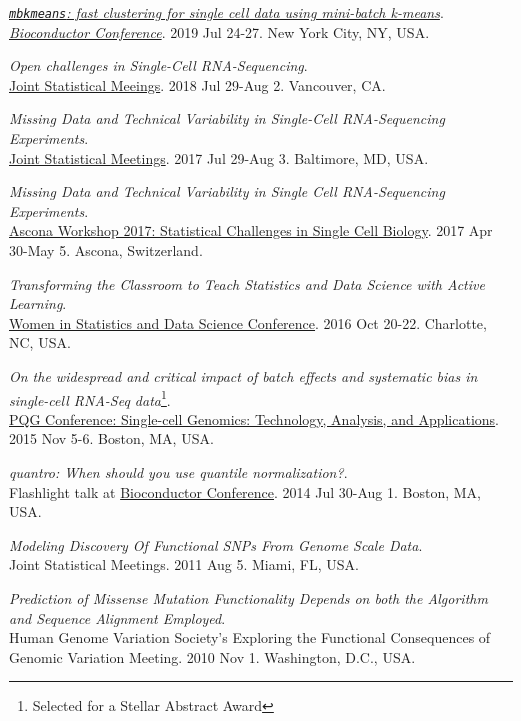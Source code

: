 \documentclass[10pt]{article}
\begin{document}
\item 
{\it \href{https://docs.google.com/presentation/d/1AlwLGTlc3ZFxY8PLpCZ5cwD3ktQyQqb1V6qub2I8360/edit?usp=sharing}{\texttt{mbkmeans}: fast clustering for single cell data using mini-batch k-means}}. \\
\href{http://bioc2019.bioconductor.org}{{\it Bioconductor Conference}}. 2019 Jul 24-27. New York City, NY, USA.
\item 
{\it Open challenges in Single-Cell RNA-Sequencing}. \\
\href{https://ww2.amstat.org/meetings/jsm/2018/onlineprogram/ActivityDetails.cfm?SessionID=215111}{Joint Statistical Meeings}. 2018 Jul 29-Aug 2. Vancouver, CA.
\item 
{\it Missing Data and Technical Variability in Single-Cell RNA-Sequencing Experiments}. \\
\href{https://ww2.amstat.org/meetings/jsm/2017/}{Joint Statistical Meetings}. 2017 Jul 29-Aug 3. Baltimore, MD, USA.
\item 
{\it Missing Data and Technical Variability in Single Cell RNA-Sequencing Experiments}. \\
\href{https://www.bsse.ethz.ch/cbg/cbg-news/ascona-2017.html}{Ascona Workshop 2017: Statistical Challenges in Single Cell Biology}. 2017 Apr 30-May 5. Ascona, Switzerland.
\item 
{\it Transforming the Classroom to Teach Statistics and Data Science with Active Learning}. \\ 
\href{http://www.amstat.org/meetings/wsds/2016/}{Women in Statistics and Data Science Conference}. 2016 Oct 20-22. Charlotte, NC, USA.
\item
{\it On the widespread and critical impact of batch effects and systematic bias in single-cell RNA-Seq data}\footnote{Selected for a Stellar Abstract Award}. \\ 
 \href{https://www.hsph.harvard.edu/2015-pqg-conference/}{PQG Conference: Single-cell Genomics: Technology, Analysis, and Applications}. 2015 Nov 5-6. Boston, MA, USA.
\item 
{\it quantro: When should you use quantile normalization?}. \\ 
Flashlight talk at \href{https://www.bioconductor.org/help/course-materials/2014/BioC2014/}{Bioconductor Conference}. 2014 Jul 30-Aug 1. Boston, MA, USA.
\item 
{\it Modeling Discovery Of Functional SNPs From Genome Scale Data}. \\
Joint Statistical Meetings. 2011 Aug 5. Miami, FL, USA.
\item 
{\it Prediction of Missense Mutation Functionality Depends on both the Algorithm and Sequence Alignment Employed}. \\
Human Genome Variation Society's Exploring the Functional Consequences of Genomic Variation Meeting. 2010 Nov 1. Washington, D.C., USA.
\end{document}

